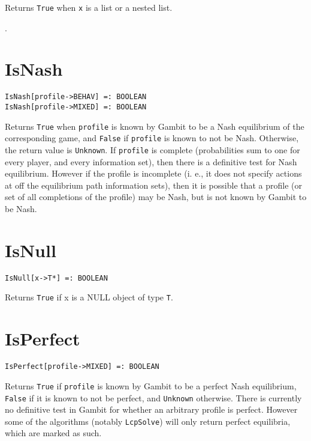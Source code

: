 \noindent
Returns \verb+True+ when \verb+x+ is a list or a nested list.

\seealso {}.


\section*{IsNash}\label{PrimIsNash}
\begin{verbatim}
IsNash[profile->BEHAV] =: BOOLEAN 
IsNash[profile->MIXED] =: BOOLEAN 
\end{verbatim}

\noindent
Returns \verb+True+ when \verb+profile+ is known by Gambit to be a
Nash equilibrium of the corresponding game, and \verb+False+ if
\verb+profile+ is known to not be Nash.  Otherwise, the return value
is \verb+Unknown+.  If \verb+profile+ is complete (probabilities sum
to one for every player, and every information set), then there is a
definitive test for Nash equilibrium.  However if the profile is
incomplete (i. e., it does not specify actions at off the equilibrium
path information sets), then it is possible that a profile (or set of
all completions of the profile) may be Nash, but is not known by
Gambit to be Nash.


\section*{IsNull}\label{PrimIsNull}
\begin{verbatim}
IsNull[x->T*] =: BOOLEAN 
\end{verbatim}
\foralltypes

\noindent
Returns \verb+True+ if x is a NULL object of type \verb+T+.  


\section*{IsPerfect}\label{PrimIsPerfect}
\begin{verbatim}
IsPerfect[profile->MIXED] =: BOOLEAN 
\end{verbatim}

\noindent
Returns \verb+True+ if \verb+profile+ is known by Gambit to be a
perfect Nash equilibrium, \verb+False+ if it is known to not be
perfect, and \verb+Unknown+ otherwise.  There is currently no
definitive test in Gambit for whether an arbitrary profile is perfect.
However some of the algorithms (notably \verb+LcpSolve+) will only
return perfect equilibria, which are marked as such.   

